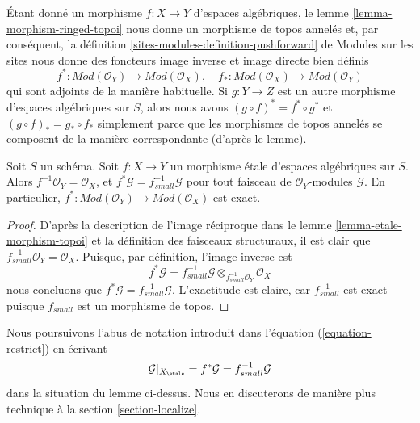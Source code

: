 \medskip\noindent
Étant donné un morphisme $f : X \to Y$ d'espaces algébriques, le
lemme \ref{lemma-morphism-ringed-topoi}
nous donne un morphisme de topos annelés et, par conséquent, la
définition \ref{sites-modules-definition-pushforward} de Modules sur les sites
nous donne des foncteurs image inverse et image directe bien définis
\begin{equation}
\label{equation-push-pull}
f^* :
\textit{Mod}(\mathcal{O}_Y)
\longrightarrow
\textit{Mod}(\mathcal{O}_X), \quad
f_* :
\textit{Mod}(\mathcal{O}_X)
\longrightarrow
\textit{Mod}(\mathcal{O}_Y)
\end{equation}
qui sont adjoints de la manière habituelle. Si $g : Y \to Z$ est un autre morphisme
d'espaces algébriques sur $S$, alors nous avons
$(g \circ f)^* = f^* \circ g^*$ et $(g \circ f)_* = g_* \circ f_*$
simplement parce que les morphismes de topos annelés se composent de la manière
correspondante (d'après le lemme).

\begin{lemma}
\label{lemma-etale-exact-pullback}
Soit $S$ un schéma.
Soit $f : X \to Y$ un morphisme \'etale d'espaces algébriques sur $S$.
Alors $f^{-1}\mathcal{O}_Y = \mathcal{O}_X$, et
$f^*\mathcal{G} = f_{small}^{-1}\mathcal{G}$ pour tout faisceau de
$\mathcal{O}_Y$-modules $\mathcal{G}$. En particulier,
$f^* : \textit{Mod}(\mathcal{O}_Y) \to \textit{Mod}(\mathcal{O}_X)$
est exact.
\end{lemma}

\begin{proof}
D'après la description de l'image réciproque dans le lemme \ref{lemma-etale-morphism-topoi}
et la définition des faisceaux structuraux, il est clair que
$f_{small}^{-1}\mathcal{O}_Y = \mathcal{O}_X$. Puisque, par définition, l'image inverse est
$$
f^*\mathcal{G} =
f_{small}^{-1}\mathcal{G} \otimes_{f_{small}^{-1}\mathcal{O}_Y}
\mathcal{O}_X
$$
nous concluons que $f^*\mathcal{G} = f_{small}^{-1}\mathcal{G}$.
L'exactitude est claire, car $f_{small}^{-1}$ est exact puisque $f_{small}$
est un morphisme de topos.
\end{proof}

\noindent
Nous poursuivons l'abus de notation introduit dans
l'équation (\ref{equation-restrict})
en écrivant
\begin{equation}
\label{equation-restrict-modules}
\mathcal{G}|_{X_\etale}
= f^*\mathcal{G}
= f_{small}^{-1}\mathcal{G}
\end{equation}
dans la situation du lemme ci-dessus. Nous en discuterons de manière plus
technique à la
section \ref{section-localize}.

